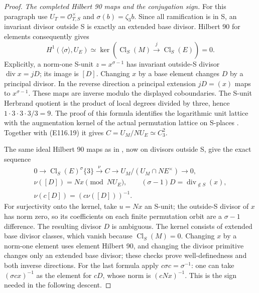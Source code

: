 \begin{proof}
\emph{The completed Hilbert 90 maps and the conjugation sign.}
For this paragraph use $U_T=\mathcal O_{T,S}^\times$ and
$\sigma(b)=\zeta_3b$. Since all ramification is in S,
an invariant divisor outside S is exactly an extended
base divisor. Hilbert 90 for elements consequently gives
\[
 H^1(\langle\sigma\rangle,U_E)
       \simeq\ker(\operatorname{Cl}_S(M)
                          \xrightarrow{j}\operatorname{Cl}_S(E))=0.
 \tag{E116.19}
\]
Explicitly, a norm-one S-unit $z=x^{\sigma-1}$ has
invariant outside-S divisor $\operatorname{div}x=jD$;
its image is $[D]$. Changing $x$ by a base element
changes $D$ by a principal divisor. In the reverse
direction a principal extension $jD=(x)$ maps to
$x^{\sigma-1}$. These maps are inverse modulo the
displayed coboundaries.
The S-unit Herbrand quotient is the product of local
degrees divided by three, hence $1\cdot3\cdot3\cdot3/3=9$.
The proof of this formula identifies the logarithmic
unit lattice with the augmentation kernel of the actual
permutation lattice on S-places
\cite[VII,Proposition 3.1 and complete proof]{E_MilneCFT}.
Together with (E116.19) it gives
$C=U_M/NU_E\simeq C_3^2$.

The same ideal Hilbert 90 maps as in
\cite[Proposition 1 and proof]{E_LemmermeyerAmbiguous}, now
on divisors outside S, give the exact sequence
\[
 \begin{gathered}
 0\longrightarrow\operatorname{Cl}_S(E)^{\sigma}\{3\}
  \xrightarrow{\nu} C
  \longrightarrow U_M/(U_M\cap NE^\times)\longrightarrow0,\\
 \nu([D])=Nx\pmod{NU_E},\qquad
                  (\sigma-1)D=\operatorname{div}_{\notin S}(x),\\
 \nu(c[D])=(c\nu([D]))^{-1}.
 \end{gathered}
 \tag{E116.20}
\]
For surjectivity onto the kernel, take $u=Nx$ an S-unit;
the outside-S divisor of $x$ has norm zero, so its
coefficients on each finite permutation orbit are a
$\sigma-1$ difference. The resulting divisor $D$ is
ambiguous. The kernel consists of extended base divisor
classes, which vanish because $\operatorname{Cl}_S(M)=0$.
Changing $x$ by a norm-one element uses element Hilbert 90,
and changing the divisor primitive changes only an
extended base divisor; these checks prove well-definedness
and both inverse directions.
For the last formula apply $c\sigma c=\sigma^{-1}$:
one can take $(\sigma c x)^{-1}$ as the element for
$cD$, whose norm is $(cNx)^{-1}$. This is the sign
needed in the following descent.


\end{proof}
